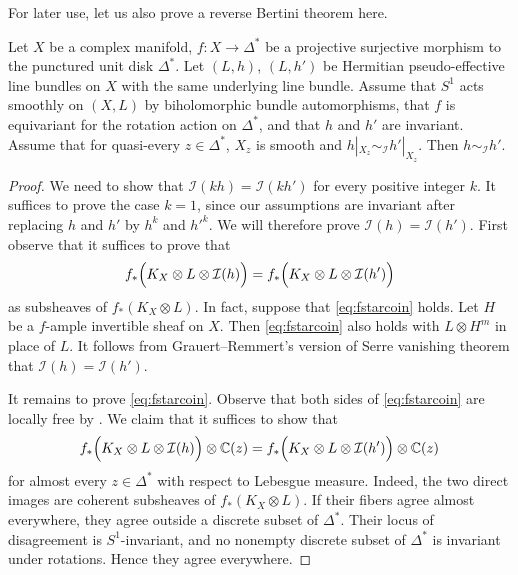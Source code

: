 For later use, let us also prove a reverse Bertini theorem here.
\begin{lemma}\label{lma:fibIeq}
Let $X$ be a complex manifold, $f\colon X\rightarrow \Delta^*$ be a projective surjective morphism to the punctured unit disk $\Delta^*$. Let $(L,h)$, $(L,h')$ be Hermitian pseudo-effective line bundles on $X$ with the same underlying line bundle. Assume that $S^1$ acts smoothly on $(X,L)$ by biholomorphic bundle automorphisms, that $f$ is equivariant for the rotation action on $\Delta^*$, and that $h$ and $h'$ are invariant.
Assume that for quasi-every $z\in \Delta^*$, $X_z$ is smooth and $h|_{X_z}\sim_{\mathcal{I}}h'|_{X_z}$. Then $h\sim_{\mathcal{I}}h'$.
\end{lemma}
\begin{proof}
We need to show that $\mathcal{I}(kh)=\mathcal{I}(kh')$ for every positive integer $k$. It suffices to prove the case $k=1$, since our assumptions are invariant after replacing $h$ and $h'$ by $h^k$ and $h'^k$. We will therefore prove $\mathcal{I}(h)=\mathcal{I}(h')$. First observe that it suffices to prove that
\begin{equation}\label{eq:fstarcoin}
f_*\Bigl(K_{X}\otimes L\otimes \mathcal{I}(h)\Bigr)=f_*\Bigl(K_{X}\otimes L\otimes \mathcal{I}(h')\Bigr)
\end{equation}
as subsheaves of $f_*(K_{X}\otimes L)$. In fact, suppose that \eqref{eq:fstarcoin} holds. Let $H$ be a $f$-ample invertible sheaf on $X$. Then \eqref{eq:fstarcoin} also holds with $L\otimes H^m$ in place of $L$. It follows from Grauert--Remmert's version of Serre vanishing theorem \cite[Theorem~2.1(A)]{BS76} that $\mathcal{I}(h)=\mathcal{I}(h')$.

It remains to prove \eqref{eq:fstarcoin}. Observe that both sides of \eqref{eq:fstarcoin} are locally free by \cite[Corollary~1.5]{Mat16}. We claim that it suffices to show that
\begin{equation}\label{eq:fstarcoin2}
f_*\Bigl(K_{X}\otimes L\otimes \mathcal{I}(h)\Bigr) \otimes \mathbb{C}(z)=f_*\Bigl(K_{X}\otimes L\otimes \mathcal{I}(h')\Bigr) \otimes \mathbb{C}(z)
\end{equation}
for almost every $z\in \Delta^*$ with respect to Lebesgue measure.
Indeed, the two direct images are coherent subsheaves of $f_*(K_X\otimes L)$. If their fibers agree almost everywhere, they agree outside a discrete subset of $\Delta^*$. Their locus of disagreement is $S^1$-invariant, and no nonempty discrete subset of $\Delta^*$ is invariant under rotations. Hence they agree everywhere.



\end{proof}
